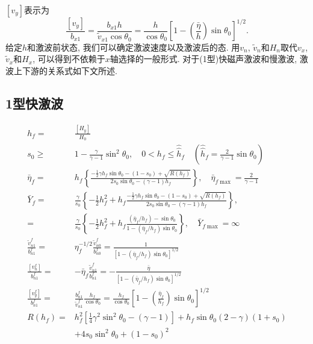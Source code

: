 \documentclass[10.5pt
]{article}
\begin{document}
$[v_y]$表示为
\begin{equation}\label{Eqn:6.2.18a}
\frac{[v_y]}{b_{x1}} = \frac{b_{x1} h}{\tilde{v}_{x1} \cos\theta_0} =
\frac{h}{\cos\theta_0} \left[1 - \left(\frac{\bar{\eta}}{h}\right)
\sin\theta_0\right]^{1/2}.
\end{equation}
给定$h$和激波前状态, 我们可以确定激波速度以及激波后的态. 用$v_n$, $\tilde
v_n$和$H_n$取代$v_x$, $\tilde v_x$和$H_x$, 可以得到不依赖于$x$轴选择的一般形式. 对于(1型)快磁声激波和慢激波, 激波上下游的关系式如下文所述.

\subsection{1型快激波}
\begin{align}
h_f =& \frac{[H_y]}{H_0}
\\
s_0 \ge& 1 - \frac{\gamma}{\gamma-1} \sin^2\theta_0, \quad 0 < h_f \le \hat{\hat{h}}_f
\quad \left(\hat{\hat{h}}_f = \frac{2}{\gamma-1} \sin\theta_0\right)
\\
\bar{\eta}_f =& h_f \left\{\frac{-\frac{1}{2} \gamma h_f \sin\theta_0 - (1-s_0) +
\sqrt{R(h_f)}}{2s_0 \sin\theta_0 - (\gamma-1) h_f}\right\}, \quad \bar{\eta}_{f\max} = \frac{2}{\gamma-1}
\\
\bar{Y}_f =& \frac{\gamma}{s_0} \left\{-\frac{1}{2} h_f^2 + h_f \frac{-\frac{1}{2}
\gamma h_f \sin\theta_0 - (1-s_0) + \sqrt{R(h_f)}}{2s_0 \sin\theta_0 - (\gamma-1)
h_f}\right\}, \nonumber
\\
=& \frac{\gamma}{s_0} \left\{-\frac{1}{2} h_f^2 + h_f \frac{(\bar{\eta}_f/h_f) -
\sin\theta_0}{1 - (\bar{\eta}_f/h_f)\sin\theta_0}\right\}, \quad \bar{Y}_{f\max} = \infty
\\
\frac{\tilde{v}_{n1}^f}{b_{n1}^f} =& \eta_f^{-1/2} \frac{\tilde{v}_{n0}^f}{b_{n0}^f} =
\frac{1}{[1 - (\bar{\eta}_f/h_f) \sin\theta_0]^{1/2}}
\\
\frac{[v_n^f]}{b_{n1}^f} =& - \bar{\eta}_f \frac{\tilde{v}_{n1}^f}{b_{n1}^f} =
-\frac{\bar{\eta}}{[1 - (\bar{\eta}_f/h_f) \sin\theta_0]^{1/2}}
\\
\frac{[v_y^f]}{b_{n1}^f} =& \frac{b_{n1}^f}{\tilde{v}_{n1}^f} \frac{h_f}{\cos\theta_0}
= \frac{h_f}{\cos\theta_0} \left[1 - \left(\frac{\bar{\eta}_f}{h_f}\right)
\sin\theta_0\right]^{1/2}
\\
R(h_f) =& h_f^2 \left[\frac{1}{4} \gamma^2 \sin^2\theta_0 - (\gamma - 1)\right] + h_f
\sin\theta_0 (2 - \gamma) (1 + s_0)
\nonumber\\
& + 4s_0 \sin^2\theta_0 + (1 - s_0)^2
\end{align}
\end{document}
